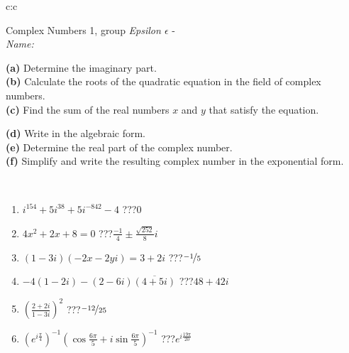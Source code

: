 \documentclass[10pt]{report}
\begin{document}
\begin{tabular}{c:c}
\begin{minipage}[c][104.5mm][t]{0.5\linewidth}
\begin{center}
\vspace{5mm}
{\huge Complex Numbers 1, group \textit{Epsilon $\epsilon$} -}\\[5mm]
\textit{Name:}\phantom{xxxxxxxxxxxxxxxxxxxxxxxxxxxxxxxxxxxxxxxxxxxxxxxxxxxxxxxxxxxxxxxxx}\\[5mm]
\begin{minipage}{0.95\linewidth}
\begin{center}
{\small \begin{minipage}{0.44\textwidth} \raggedright
\textbf{(a)} Determine the imaginary part. \\[1mm]
\textbf{(b)} Calculate the roots of the quadratic equation in the field of complex numbers. \\[1mm]
\textbf{(c)} Find the sum of the real numbers \(x\) and \(y\) that satisfy the equation. \end{minipage} \begin{minipage}{0.54\textwidth}
\textbf{(d)} Write in the algebraic form. \\[1mm]
\textbf{(e)} Determine the real part of the complex number. \\[1mm]
\textbf{(f)} Simplify and write the resulting complex number in the exponential form.
\end{minipage}
} \vspace{3mm}
\end{center}
\end{minipage}
\\[1mm]
\begin{minipage}{0.79\linewidth}
\begin{center}
\begin{varwidth}{\linewidth}
\setlength{\itemsep}{0pt}
\begin{enumerate}
\large
\item $i^{154}+5i^{38}+5i^{-842}-4$\quad \dotfill\; ???\;\dotfill \quad $0$
\item $4x^2+2x+8=0$\quad \dotfill\; ???\;\dotfill \quad $\frac{-1}{4} \pm{}\frac{ \sqrt{252}}{8}i$
\item $(1-3i)(-2x-2yi)=3+2i$\quad \dotfill\; ???\;\dotfill \quad $\nicefrac{-1}{5}$
\item $-4(1-2i)-(2-6i)\overline{(4+5i)}$\quad \dotfill\; ???\;\dotfill \quad $48+42i$
\item $\left(\frac{2+2i}{1-3i}\right)^2$\quad \dotfill\; ???\;\dotfill \quad $\nicefrac{-12}{25}$
\item $\left(e^{i\frac{\pi}{4}}\right)^{-1}\left(\cos{\frac{6\pi}{5}}+i\sin{\frac{6\pi}{5}}\right)^{-1}$\quad \dotfill\; ???\;\dotfill \quad $e^{i\frac{19\pi}{20}}$

\end{enumerate}
\end{varwidth}
\end{center}
\end{minipage}
\end{center}
\end{minipage}
\end{tabular}
\end{document}
